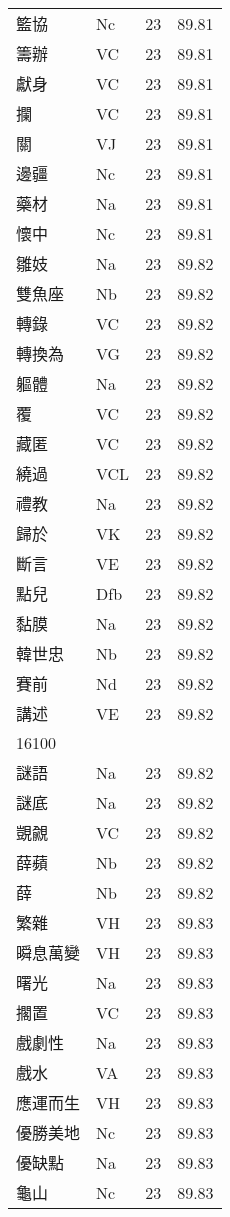 \documentclass[twocolumn]{book}
\begin{document}
\begin{supertabular}{llrr}
籃協 & Nc & 23 &  89.81\\
籌辦 & VC & 23 &  89.81\\
獻身 & VC & 23 &  89.81\\
攔 & VC & 23 &  89.81\\
關 & VJ & 23 &  89.81\\
邊疆 & Nc & 23 &  89.81\\
藥材 & Na & 23 &  89.81\\
懷中 & Nc & 23 &  89.81\\
雛妓 & Na & 23 &  89.82\\
雙魚座 & Nb & 23 &  89.82\\
轉錄 & VC & 23 &  89.82\\
轉換為 & VG & 23 &  89.82\\
軀體 & Na & 23 &  89.82\\
覆 & VC & 23 &  89.82\\
藏匿 & VC & 23 &  89.82\\
繞過 & VCL & 23 &  89.82\\
禮教 & Na & 23 &  89.82\\
歸於 & VK & 23 &  89.82\\
斷言 & VE & 23 &  89.82\\
點兒 & Dfb & 23 &  89.82\\
黏膜 & Na & 23 &  89.82\\
韓世忠 & Nb & 23 &  89.82\\
賽前 & Nd & 23 &  89.82\\
講述 & VE & 23 &  89.82\\
16100\\
謎語 & Na & 23 &  89.82\\
謎底 & Na & 23 &  89.82\\
覬覦 & VC & 23 &  89.82\\
薛蘋 & Nb & 23 &  89.82\\
薛 & Nb & 23 &  89.82\\
繁雜 & VH & 23 &  89.83\\
瞬息萬變 & VH & 23 &  89.83\\
曙光 & Na & 23 &  89.83\\
擱置 & VC & 23 &  89.83\\
戲劇性 & Na & 23 &  89.83\\
戲水 & VA & 23 &  89.83\\
應運而生 & VH & 23 &  89.83\\
優勝美地 & Nc & 23 &  89.83\\
優缺點 & Na & 23 &  89.83\\
龜山 & Nc & 23 &  89.83\\

\end{supertabular}
\end{document}
